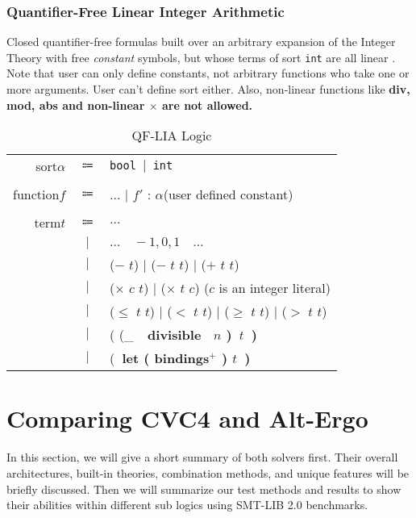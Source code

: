 \documentclass[10pt,twocolumn,letter]{article}
\theoremstyle{definition}
\begin{document}
\subsubsection{Quantifier-Free Linear Integer Arithmetic}
Closed quantifier-free formulas built over an arbitrary expansion of the
Integer Theory with free {\it constant} symbols, but whose terms of sort {\tt int}
are all linear \cite{bs2010}. Note that user can only define constants, not arbitrary functions who take one or more arguments. User can't define sort either. Also, non-linear functions like \bf div\rm, \bf mod\rm, \bf abs \rm and non-linear $\times$ are not allowed.

\begin{table*}[!h]
\begin{mdframed}
\centering
\begin{tabular}{r c l}
sort\qquad $\alpha$ & $\Coloneqq$ & \tt bool $\mid$ int\\
\\
function\qquad $f$ & $\Coloneqq$ & $\ldots$ $\mid$ \rm $f'$ : $\alpha$\qquad(user defined constant)\\
\\
term\qquad $t$ & $\Coloneqq$ & $\ldots$ \\
& $\mid$ & $\ldots\quad-1,0,1\quad\ldots$\\
& $\mid$ & ($-$ $t$) $\mid$ ($-$ $t$ $t$) $\mid$ ($+$ $t$ $t$) \\
& $\mid$ & ($\times$ $c$ $t$) $\mid$ ($\times$ $t$ $c$) \qquad($c$ is an integer literal)\\
& $\mid$ & ($\leqslant$ $t$ $t$) $\mid$ ($<$ $t$ $t$) $\mid$ ($\geqslant$ $t$ $t$) $\mid$ ($>$ $t$ $t$)\\
& $\mid$ & ( (_\ \bf\ divisible \rm\ $n$ )\ $t$\ )\\
& $\mid$ & (\bf\ let \rm ( bindings$^+$ ) $t$\ )\\

\end{tabular}
\end{mdframed}
\caption{QF-LIA Logic}
\end{table*}

\section{Comparing CVC4 and Alt-Ergo}

In this section, we will give a short summary of both solvers first. Their overall architectures, built-in theories, combination methods, and unique features will be briefly discussed. Then we will summarize our test methods and results to show their abilities within different sub logics using SMT-LIB 2.0 benchmarks.
\end{document}
